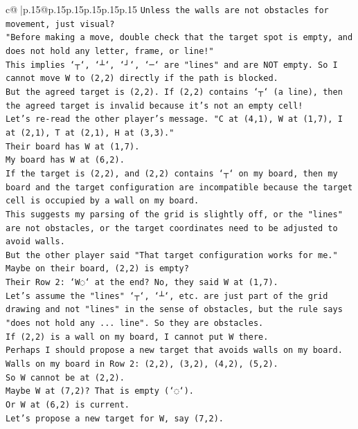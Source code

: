 \documentclass{article}
\begin{document}
{\begin{supertabular}{c@{$\;$}|p{.15\linewidth}@{}p{.15\linewidth}p{.15\linewidth}p{.15\linewidth}p{.15\linewidth}p{.15\linewidth}}
{{{\texttt{Unless the walls are not obstacles for movement, just visual?} \\
\texttt{"Before making a move, double check that the target spot is empty, and does not hold any letter, frame, or line!"} \\
\texttt{This implies `┬`, `┴`, `┘`, `─` are "lines" and are NOT empty. So I cannot move W to (2,2) directly if the path is blocked.} \\
\texttt{But the agreed target is (2,2). If (2,2) contains `┬` (a line), then the agreed target is invalid because it's not an empty cell!} \\
\texttt{Let's re{-}read the other player's message. "C at (4,1), W at (1,7), I at (2,1), T at (2,1), H at (3,3)."} \\
\texttt{Their board has W at (1,7).} \\
\texttt{My board has W at (6,2).} \\
\texttt{If the target is (2,2), and (2,2) contains `┬` on my board, then my board and the target configuration are incompatible because the target cell is occupied by a wall on my board.} \\
\texttt{This suggests my parsing of the grid is slightly off, or the "lines" are not obstacles, or the target coordinates need to be adjusted to avoid walls.} \\
\texttt{But the other player said "That target configuration works for me."} \\
\texttt{Maybe on their board, (2,2) is empty?} \\
\texttt{Their Row 2: `W◌` at the end? No, they said W at (1,7).} \\
\texttt{Let's assume the "lines" `┬`, `┴`, etc. are just part of the grid drawing and not "lines" in the sense of obstacles, but the rule says "does not hold any ... line". So they are obstacles.} \\
\texttt{If (2,2) is a wall on my board, I cannot put W there.} \\
\texttt{Perhaps I should propose a new target that avoids walls on my board.} \\
\texttt{Walls on my board in Row 2: (2,2), (3,2), (4,2), (5,2).} \\
\texttt{So W cannot be at (2,2).} \\
\texttt{Maybe W at (7,2)? That is empty (`◌`).} \\
\texttt{Or W at (6,2) is current.} \\
\texttt{Let's propose a new target for W, say (7,2).} \\
}}}
\end{supertabular}}
\end{document}
